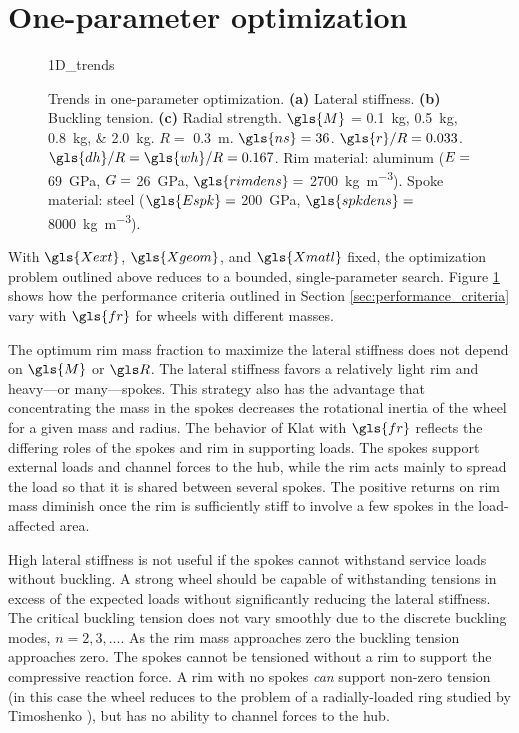 \documentclass[\rootdir/thesis.tex]{subfiles}
\begin{document}
\section{One-parameter optimization}



\begin{figure}
\centering
{1D_trends}
\caption{Trends in one-parameter optimization. \textbf{(a)} Lateral stiffness. \textbf{(b)} Buckling tension. \textbf{(c)} Radial strength. $\gls{M}$ = \SIlist[list-units=single]{0.1;0.5;0.8;2.0}{kg}. $R=$ \SI{0.3}{m}. $\gls{ns}=36$. $\gls{r}/R=0.033$. $\gls{dh}/R=\gls{wh}/R=0.167$. Rim material: aluminum ($E=$ \SI{69}{GPa}, $G=$ \SI{26}{GPa}, $\gls{rimdens}=$ \SI{2700}{kg.m^{-3}}). Spoke material: steel ($\gls{Espk}=$ \SI{200}{GPa}, $\gls{spkdens}=$ \SI{8000}{kg.m^{-3}}).}
\label{fig:opt_1D_trends}
\end{figure}

With $\gls{Xext}$, $\gls{Xgeom}$, and $\gls{Xmatl}$ fixed, the optimization problem outlined above reduces to a bounded, single-parameter search. Figure \ref{fig:opt_1D_trends} shows how the performance criteria outlined in Section \ref{sec:performance_criteria} vary with $\gls{fr}$ for wheels with different masses. 

The optimum rim mass fraction to maximize the lateral stiffness does not depend on $\gls{M}$ or $\R$. The lateral stiffness favors a relatively light rim and heavy---or many---spokes. This strategy also has the advantage that concentrating the mass in the spokes decreases the rotational inertia of the wheel for a given mass and radius. The behavior of \gls{Klat} with $\gls{fr}$ reflects the differing roles of the spokes and rim in supporting loads. The spokes support external loads and channel forces to the hub, while the rim acts mainly to spread the load so that it is shared between several spokes. The positive returns on rim mass diminish once the rim is sufficiently stiff to involve a few spokes in the load-affected area.

High lateral stiffness is not useful if the spokes cannot withstand service loads without buckling. A strong wheel should be capable of withstanding tensions in excess of the expected loads without significantly reducing the lateral stiffness. The critical buckling tension does not vary smoothly due to the discrete buckling modes, $n=2,3,...$. As the rim mass approaches zero the buckling tension approaches zero. The spokes cannot be tensioned without a rim to support the compressive reaction force. A rim with no spokes \emph{can} support non-zero tension (in this case the wheel reduces to the problem of a radially-loaded ring studied by Timoshenko \cite{Timoshenko1961}), but has no ability to channel forces to the hub.
\end{document}

